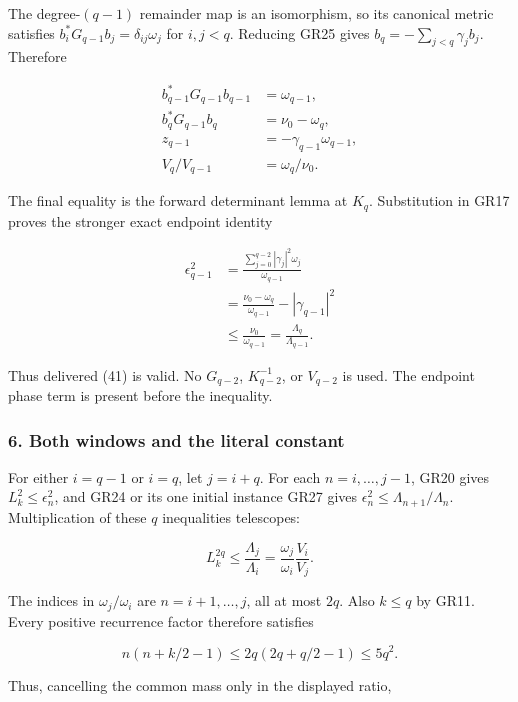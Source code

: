 The degree-\((q-1)\) remainder map is an isomorphism, so its canonical metric satisfies \(b_i^*G_{q-1}b_j=\delta_{ij}\omega_j\) for \(i,j<q\). Reducing GR25 gives \(b_q=-\sum_{j<q}\gamma_jb_j\). Therefore

\[
\begin{aligned}
b_{q-1}^*G_{q-1}b_{q-1}&=\omega_{q-1},\\
b_q^*G_{q-1}b_q&=\nu_0-\omega_q,\\
z_{q-1}&=-\gamma_{q-1}\omega_{q-1},\\
V_q/V_{q-1}&=\omega_q/\nu_0.
\end{aligned}
\tag{GR26}
\]

The final equality is the forward determinant lemma at \(K_q\). Substitution in GR17 proves the stronger exact endpoint identity

\[
\begin{aligned}
\epsilon_{q-1}^2
&=\frac{\sum_{j=0}^{q-2}|\gamma_j|^2\omega_j}{\omega_{q-1}}\\
&=\frac{\nu_0-\omega_q}{\omega_{q-1}}-|\gamma_{q-1}|^2\\
&\le\frac{\nu_0}{\omega_{q-1}}
=\frac{\Lambda_q}{\Lambda_{q-1}}.
\end{aligned}
\tag{GR27}
\]

Thus delivered (41) is valid. No \(G_{q-2}\), \(K_{q-2}^{-1}\), or \(V_{q-2}\) is used. The endpoint phase term is present before the inequality.

\subsubsection{6. Both windows and the literal constant}\label{endpoint-gamma_review--both-windows-and-the-literal-constant}

For either \(i=q-1\) or \(i=q\), let \(j=i+q\). For each \(n=i,\ldots,j-1\), GR20 gives \(L_k^2\le\epsilon_n^2\), and GR24 or its one initial instance GR27 gives \(\epsilon_n^2\le\Lambda_{n+1}/\Lambda_n\). Multiplication of these \(q\) inequalities telescopes:

\[
L_k^{2q}\le\frac{\Lambda_j}{\Lambda_i}
=\frac{\omega_j}{\omega_i}\frac{V_i}{V_j}.
\tag{GR28}
\]

The indices in \(\omega_j/\omega_i\) are \(n=i+1,\ldots,j\), all at most \(2q\). Also \(k\le q\) by GR11. Every positive recurrence factor therefore satisfies

\[
n(n+k/2-1)\le2q(2q+q/2-1)\le5q^2.
\tag{GR29}
\]

Thus, cancelling the common mass only in the displayed ratio,

